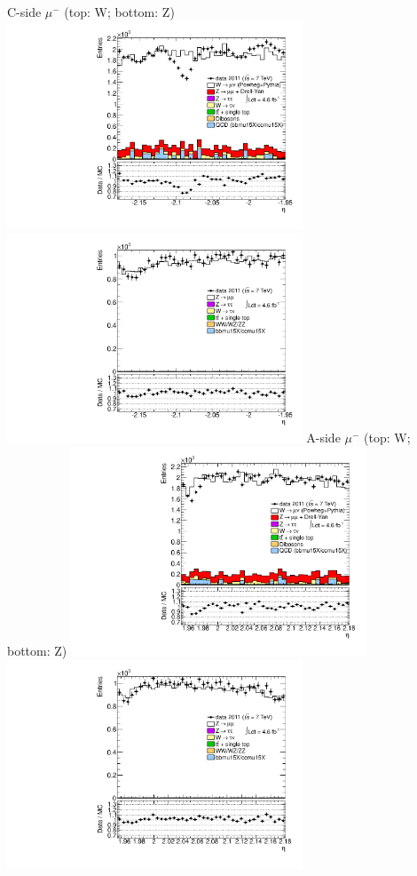  {
\colb[T]
C-side $\mu^{-}$ (top: W; bottom: Z)
\centering
\includegraphics[width=0.66\textwidth]{dates/20130306/figures/etaphi/WlQ2_10_C_stack_l_eta_NEG} \\
\includegraphics[width=0.66\textwidth]{dates/20130306/figures/etaphi/Z_10_C_stack_lN_eta_ALL.pdf}
A-side $\mu^{-}$ (top: W; bottom: Z)
\centering
\includegraphics[width=0.66\textwidth]{dates/20130306/figures/etaphi/WlQ2_10_A_stack_l_eta_NEG} \\
\includegraphics[width=0.66\textwidth]{dates/20130306/figures/etaphi/Z_10_A_stack_lN_eta_ALL.pdf} 
\cole
} %
